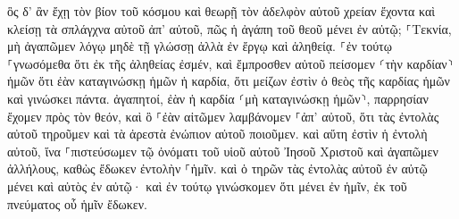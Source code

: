 \documentclass{openreader}
\begin{document}
ὃς δ’ ἂν ἔχῃ τὸν βίον τοῦ κόσμου καὶ θεωρῇ τὸν ἀδελφὸν αὐτοῦ χρείαν ἔχοντα καὶ κλείσῃ τὰ σπλάγχνα αὐτοῦ ἀπ’ αὐτοῦ, πῶς ἡ ἀγάπη τοῦ θεοῦ μένει ἐν αὐτῷ; 
⸀Τεκνία, μὴ ἀγαπῶμεν λόγῳ μηδὲ τῇ γλώσσῃ ἀλλὰ ἐν ἔργῳ καὶ ἀληθείᾳ. 
⸀ἐν τούτῳ ⸀γνωσόμεθα ὅτι ἐκ τῆς ἀληθείας ἐσμέν, καὶ ἔμπροσθεν αὐτοῦ πείσομεν ⸂τὴν καρδίαν⸃ ἡμῶν 
ὅτι ἐὰν καταγινώσκῃ ἡμῶν ἡ καρδία, ὅτι μείζων ἐστὶν ὁ θεὸς τῆς καρδίας ἡμῶν καὶ γινώσκει πάντα. 
ἀγαπητοί, ἐὰν ἡ καρδία ⸂μὴ καταγινώσκῃ ἡμῶν⸃, παρρησίαν ἔχομεν πρὸς τὸν θεόν, 
καὶ ὃ ⸀ἐὰν αἰτῶμεν λαμβάνομεν ⸀ἀπ’ αὐτοῦ, ὅτι τὰς ἐντολὰς αὐτοῦ τηροῦμεν καὶ τὰ ἀρεστὰ ἐνώπιον αὐτοῦ ποιοῦμεν. 
καὶ αὕτη ἐστὶν ἡ ἐντολὴ αὐτοῦ, ἵνα ⸀πιστεύσωμεν τῷ ὀνόματι τοῦ υἱοῦ αὐτοῦ Ἰησοῦ Χριστοῦ καὶ ἀγαπῶμεν ἀλλήλους, καθὼς ἔδωκεν ἐντολὴν ⸀ἡμῖν. 
καὶ ὁ τηρῶν τὰς ἐντολὰς αὐτοῦ ἐν αὐτῷ μένει καὶ αὐτὸς ἐν αὐτῷ· καὶ ἐν τούτῳ γινώσκομεν ὅτι μένει ἐν ἡμῖν, ἐκ τοῦ πνεύματος οὗ ἡμῖν ἔδωκεν. 
\end{document}

